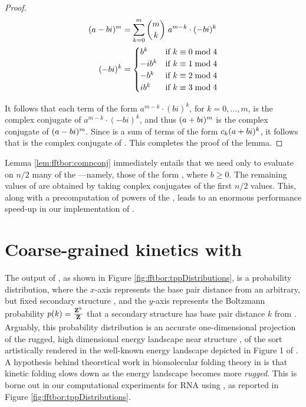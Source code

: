 \begin{proof}
\begin{align}
\begin{split}
(a-bi)^m &= \sum_{k=0}^m {m \choose k}\; a^{m-k} \cdot (-bi)^k \\
(-bi)^k &=
\begin{cases}
b^k   & \text{if $k \equiv 0 \bmod 4$} \\
-ib^k & \text{if $k \equiv 1 \bmod 4$} \\
-b^k  & \text{if $k \equiv 2 \bmod 4$} \\
ib^k  & \text{if $k \equiv 3 \bmod 4$} \\
\end{cases}
\end{split}
\end{align}

It follows that each term of the form
$a^{m-k} \cdot (bi)^k$, for $k=0,\dots,m$, is the complex conjugate of
$a^{m-k} \cdot (-bi)^k$, and thus $(a+bi)^m$ is the complex conjugate of
$(a-bi)^m$. Since \emZof{}{\aPbi} is a sum of terms of the form $c_k (a+bi)^k$,
it follows that \emZof{}{\aMbi} is the complex conjugate of \emZof{}{\aPbi}.
This completes the proof of the lemma.

\end{proof}

Lemma \ref{lem:fftbor:compconj} immediately entails that we need only to evaluate \fullZx on $n/2$
many of the \nRoUs---namely, those of the form
\aPbi, where $b \geq 0$. The remaining values of \fullZx are obtained by
taking conplex conjugates of the first $n/2$ values. This, along with a
precomputation of powers of the \nRoUs, leads to an
enormous performance speed-up in our implementation of \fftbor.

\section{Coarse-grained kinetics with \fftbor}
\label{sec:fftbor:kinetics}

The output of \fftbor, as shown in Figure
\ref{fig:fftbor:tppDistributions}, is a probability distribution,
where the $x$-axis represents the base pair distance from an arbitrary,
but fixed secondary structure \strSt, and the $y$-axis represents the
Boltzmann probability $p(k) = \frac{{\bf Z}^{k}_{}}{{\bf Z}^{}_{}}$ that a secondary structure
has base pair distance $k$ from \strSt. Arguably, this probability distribution
is an accurate one-dimensional projection of the rugged, high dimensional energy
landscape near structure \strSt,
of the sort artistically rendered in the well-known
energy landscape depicted in Figure 1 of \citep{Wolynes.ptam05}.
A hypothesis behind theoretical work in biomolecular folding theory in
\citep{Bryngelson.p95}
is that kinetic folding slows down as the energy landscape becomes more
{\em rugged}. This is borne out in our computational experiments for RNA
using \fftbor, as reported
in Figure \ref{fig:fftbor:tppDistributions}.

